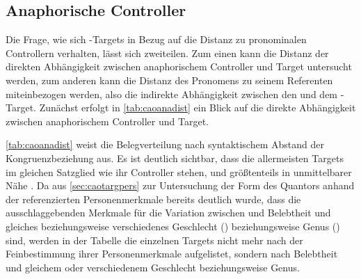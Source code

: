 \subsection{Anaphorische Controller}
\label{subsec:caodistanactrl}

Die Frage, wie sich -Targets in Bezug auf die Distanz zu
pronominalen Controllern verhalten, lässt sich zweiteilen. Zum einen kann die
Distanz der direkten Abhängigkeit zwischen anaphorischem Controller und Target
untersucht werden, zum anderen kann die Distanz des Pronomens zu seinem
Referenten miteinbezogen werden, also die indirekte Abhängigkeit zwischen den
 und dem -Target. Zunächst erfolgt in
\cref{tab:caoanadist} ein Blick auf die direkte Abhängigkeit zwischen
anaphorischem Controller und Target.

\cref{tab:caoanadist} weist die Belegverteilung nach syntaktischem Abstand der
Kongruenzbeziehung aus. Es ist deutlich sichtbar, dass die allermeisten Targets
im gleichen Satzglied wie ihr Controller stehen, und größtenteils in
unmittelbarer Nähe \autocite[vgl.][526--527]{ksw2}. Da aus
\cref{sec:caotargpers} zur Untersuchung der Form des Quantors 
anhand der referenzierten Personenmerkmale bereits deutlich wurde, dass die
ausschlaggebenden Merkmale für die Variation zwischen  und
 Belebtheit und gleiches beziehungsweise verschiedenes Geschlecht
(\Sex) beziehungsweise Genus (\Gend) sind, werden in der Tabelle die einzelnen
Targets nicht mehr nach der Feinbestimmung ihrer Personenmerkmale aufgelistet,
sondern nach Belebtheit und gleichem oder verschiedenem Geschlecht
beziehungsweise Genus.

